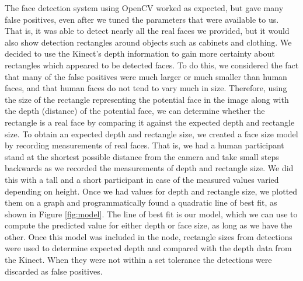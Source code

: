 \documentclass[conference]{IEEEtran}
\begin{document}
The face detection system using OpenCV worked as expected, but gave many false positives, even after we tuned the parameters that were available to us. That is, it was able to detect nearly all the real faces we provided, but it would also show detection rectangles around objects such as cabinets and clothing. We decided to use the Kinect's depth information to gain more certainty about rectangles which appeared to be detected faces. To do this, we considered the fact that many of the false positives were much larger or much smaller than human faces, and that human faces do not tend to vary much in size. Therefore, using the size of the rectangle representing the potential face in the image along with the depth (distance) of the potential face, we can determine whether the rectangle is a real face by comparing it against the expected depth and rectangle size. To obtain an expected depth and rectangle size, we created a face size model by recording measurements of real faces. That is, we had a human participant stand at the shortest possible distance from the camera and take small steps backwards as we recorded the measurements of depth and rectangle size. We did this with a tall and a short participant in case of the measured values varied depending on height. Once we had values for depth and rectangle size, we plotted them on a graph and programmatically found a quadratic line of best fit, as shown in Figure \ref{fig:model}. The line of best fit is our model, which we can use to compute the predicted value for either depth or face size, as long as we have the other. Once this model was included in the node, rectangle sizes from detections were used to determine expected depth and compared with the depth data from the Kinect. When they were not within a set tolerance the detections were discarded as false positives.
\end{document}
